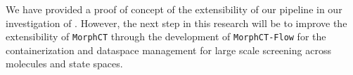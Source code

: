 We have provided a proof of concept of the extensibility of our pipeline
in our investigation of . However, the next step in this research
will be to improve the extensibility of \texttt{MorphCT} through the development
of \texttt{MorphCT-Flow} for the containerization and dataspace management for
large scale screening across molecules and state spaces. 











